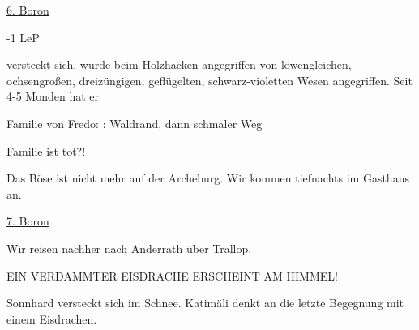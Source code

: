 
\underline{6. Boron}

-1 LeP

 versteckt sich, wurde beim Holzhacken angegriffen von löwengleichen, ochsengroßen, dreizüngigen, geflügelten, schwarz-violetten Wesen angegriffen. Seit 4-5 Monden hat er 

Familie von Fredo: : Waldrand, dann schmaler Weg

Familie ist tot?!

Das Böse ist nicht mehr auf der Archeburg. 
Wir kommen tiefnachts im Gasthaus an.


\underline{7. Boron}

Wir reisen nachher nach Anderrath über Trallop.

EIN VERDAMMTER EISDRACHE ERSCHEINT AM HIMMEL!

Sonnhard versteckt sich im Schnee. Katimäli denkt an die letzte Begegnung mit einem Eisdrachen.